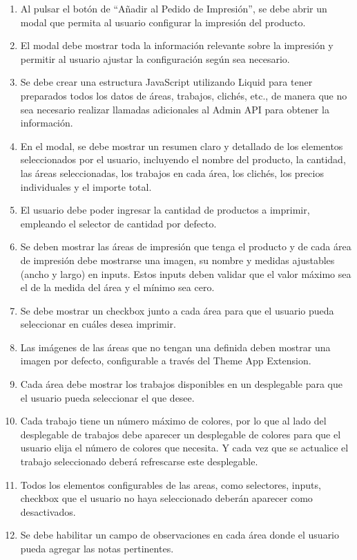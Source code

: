 \documentclass[12pt]{article}
\begin{document}
\begin{enumerate}[label=\arabic*.]
    \item Al pulsar el botón de ``Añadir al Pedido de Impresión'', se debe abrir un modal que permita al usuario configurar la impresión del producto.
    \item El modal debe mostrar toda la información relevante sobre la impresión y permitir al usuario ajustar la configuración según sea necesario.
    \item Se debe crear una estructura JavaScript utilizando Liquid para tener preparados todos los datos de áreas, trabajos, clichés, etc., de manera que no sea necesario realizar llamadas adicionales al Admin API para obtener la información.
    \item En el modal, se debe mostrar un resumen claro y detallado de los elementos seleccionados por el usuario, incluyendo el nombre del producto, la cantidad, las áreas seleccionadas, los trabajos en cada área, los clichés, los precios individuales y el importe total.
    \item El usuario debe poder ingresar la cantidad de productos a imprimir, empleando el selector de cantidad por defecto.
    \item Se deben mostrar las áreas de impresión que tenga el producto y de cada área de impresión debe mostrarse una imagen, su nombre y medidas ajustables (ancho y largo) en inputs. Estos inputs deben validar que el valor máximo sea el de la medida del área y el mínimo sea cero.
    \item Se debe mostrar un checkbox junto a cada área para que el usuario pueda seleccionar en cuáles desea imprimir.
    \item Las imágenes de las áreas que no tengan una definida deben mostrar una imagen por defecto, configurable a través del Theme App Extension.
    \item Cada área debe mostrar los trabajos disponibles en un desplegable para que el usuario pueda seleccionar el que desee.
    \item Cada trabajo tiene un número máximo de colores, por lo que al lado del desplegable de trabajos debe aparecer un desplegable de colores para que el usuario elija el número de colores que necesita. Y cada vez que se actualice el trabajo seleccionado deberá refrescarse este desplegable.
    \item Todos los elementos configurables de las areas, como selectores, inputs, checkbox que el usuario no haya seleccionado deberán aparecer como desactivados.
    \item Se debe habilitar un campo de observaciones en cada área donde el usuario pueda agregar las notas pertinentes.

\end{enumerate}
\end{document}
